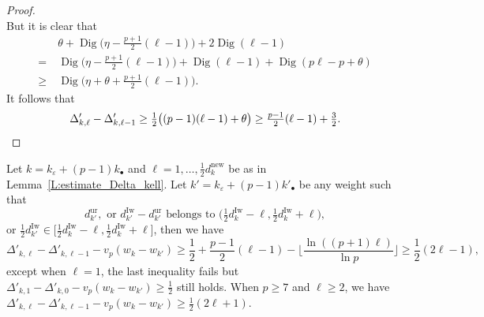 \begin{proof}
\begin{equation}
    \end{equation}
    But it is clear that
    \begin{align}
    \nonumber
    &\theta + {\operatorname{Dig}}\big(\eta -\tfrac{p+1}2(\ell-1)\big) + 2{\operatorname{Dig}}(\ell-1)
    \\
    \nonumber
    =\ &{\operatorname{Dig}}\big(\eta -\tfrac{p+1}2(\ell-1)\big) + {\operatorname{Dig}}(\ell-1) + {\operatorname{Dig}}(p\ell-p+\theta)
    \\
    \label{E:inequality_in_difference_of_delta} \geq\ & {\operatorname{Dig}}\big(\eta +\theta+\tfrac{p+1}2(\ell-1)\big).
    \end{align}
    It follows that
    \[
    \Delta'_{k, \ell} - \Delta'_{k, \ell-1} \geq \tfrac 12\big((p-1) (\ell-1) + \theta \big) \geq \tfrac{p-1}2(\ell-1) + \tfrac 32. \qedhere
    \]
\end{proof}

\begin{corollary}
    \label{C:finer_inequality_for_Delta}
    Let $k = k_\varepsilon + (p-1)k_\bullet$ and $\ell =1, \dots, \frac 12 d_k^{\mathrm{new}}$ be as in Lemma~\ref{L:estimate_Delta_kell}. Let $k' = k_\varepsilon + (p-1) k'_\bullet$
    be any weight such that
    \begin{equation}
    \label{E:dk_prime_boundaries_belongs_to_NS_range}
    d_{k'}^{\mathrm{ur}}, \textrm{ or }d_{k'}^{\mathrm{Iw}}- d_{k'}^{\mathrm{ur}}\textrm{  belongs to }\big(\tfrac 12d_k^{\mathrm{Iw}}-\ell, \tfrac 12 d_k^{\mathrm{Iw}}+\ell\big)
    ,
    \end{equation}
    or $\frac 12d_{k'}^{\mathrm{Iw}}\in \big[\tfrac 12d_k^{\mathrm{Iw}}-\ell, \tfrac 12 d_k^{\mathrm{Iw}}+\ell\big]$,
    then we have
    \begin{equation}
    \label{E:Delta_kl_difference_strong}
    \Delta'_{k, \ell} - \Delta'_{k,\ell-1} -v_p(w_k - w_{k'}) \geq \frac 12 + \frac {p-1}2(\ell-1) -\Big \lfloor \frac{\ln((p+1) \ell)}{\ln p}\Big\rfloor  \geq \frac 12 (2\ell-1),
    \end{equation}
    except when $\ell = 1$, the last inequality fails but $\Delta'_{k, 1} - \Delta'_{k,0} - v_p(w_{k} - w_{k'}) \geq \frac 12$ still holds.
    When $p \geq 7$ and $\ell \geq 2$, we have
    $\Delta'_{k, \ell} - \Delta'_{k,\ell-1}-v_p(w_{k}-w_{k'}) \geq \frac 12(2\ell+1)$.
\end{corollary}

